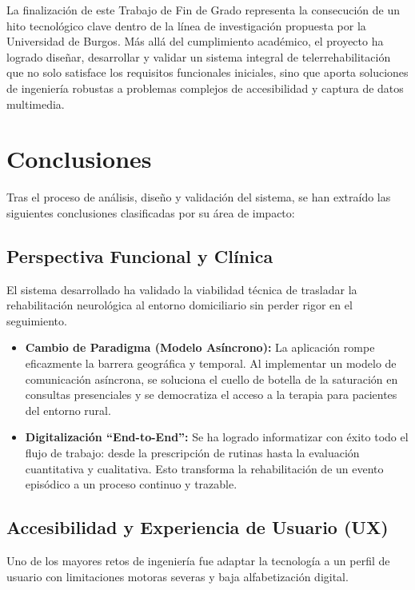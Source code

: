
La finalización de este Trabajo de Fin de Grado representa la consecución de un hito tecnológico clave dentro de la línea de investigación propuesta por la Universidad de Burgos. Más allá del cumplimiento académico, el proyecto ha logrado diseñar, desarrollar y validar un sistema integral de telerrehabilitación que no solo satisface los requisitos funcionales iniciales, sino que aporta soluciones de ingeniería robustas a problemas complejos de accesibilidad y captura de datos multimedia.

\section{Conclusiones}

Tras el proceso de análisis, diseño y validación del sistema, se han extraído las siguientes conclusiones clasificadas por su área de impacto:

\subsection{Perspectiva Funcional y Clínica}
El sistema desarrollado ha validado la viabilidad técnica de trasladar la rehabilitación neurológica al entorno domiciliario sin perder rigor en el seguimiento. 

\begin{itemize}
    \item \textbf{Cambio de Paradigma (Modelo Asíncrono):} La aplicación rompe eficazmente la barrera geográfica y temporal. Al implementar un modelo de comunicación asíncrona, se soluciona el cuello de botella de la saturación en consultas presenciales y se democratiza el acceso a la terapia para pacientes del entorno rural.
    \item \textbf{Digitalización ``End-to-End'':} Se ha logrado informatizar con éxito todo el flujo de trabajo: desde la prescripción de rutinas hasta la evaluación cuantitativa y cualitativa. Esto transforma la rehabilitación de un evento episódico a un proceso continuo y trazable.
\end{itemize}

\subsection{Accesibilidad y Experiencia de Usuario (UX)}
Uno de los mayores retos de ingeniería fue adaptar la tecnología a un perfil de usuario con limitaciones motoras severas y baja alfabetización digital.

